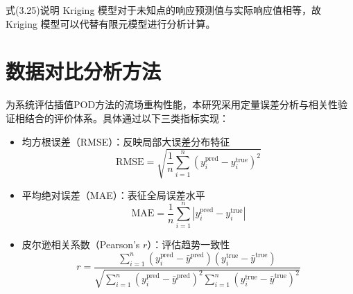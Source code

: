 式(3.25)说明 Kriging 模型对于未知点的响应预测值与实际响应值相等，故 Kriging
模型可以代替有限元模型进行分析计算。 
\section{数据对比分析方法}
\label{sec:4.1}
为系统评估插值POD方法的流场重构性能，本研究采用定量误差分析与相关性验证相结合的评价体系。具体通过以下三类指标实现：

\begin{itemize}
    \item {均方根误差（RMSE）}：反映局部大误差分布特征
    \begin{equation}
        \text{RMSE} = \sqrt{\frac{1}{n} \sum_{i=1}^{n} \left( y_i^{\text{pred}} - y_i^{\text{true}} \right)^2}
        \label{eq:rmse}
    \end{equation}

    \item{平均绝对误差（MAE）}：表征全局误差水平
    \begin{equation}
        \text{MAE} = \frac{1}{n} \sum_{i=1}^{n} \left| y_i^{\text{pred}} - y_i^{\text{true}} \right|
        \label{eq:mae}
    \end{equation}

    \item{皮尔逊相关系数（Pearson's $r$）}：评估趋势一致性
    \begin{equation}
        r = \frac{\sum_{i=1}^{n} (y_i^{\text{pred}} - \bar{y}^{\text{pred}})(y_i^{\text{true}} - \bar{y}^{\text{true}})}
        {\sqrt{\sum_{i=1}^{n} (y_i^{\text{pred}} - \bar{y}^{\text{pred}})^2 \sum_{i=1}^{n} (y_i^{\text{true}} - \bar{y}^{\text{true}})^2}}
        \label{eq:pearson}
    \end{equation}
\end{itemize}






